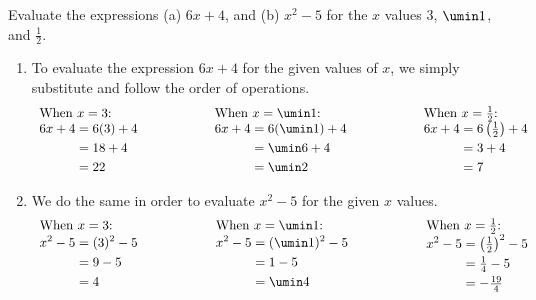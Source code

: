 \begin{boxex}
\label{ex:evaluating}
Evaluate the expressions (a) $6x+ 4$, and (b) $x^2 - 5$ for the $x$ values 3, $\umin1$, and $\frac{1}{2}$.

\exsoln{}
\begin{enumerate}[label={(\alph*)}]
\item To evaluate the expression $6x + 4$ for the given values of $x$, we simply substitute and follow the order of operations.
\[
\begin{array}{lllll}
\text{When $x=3$:}
&
&
\text{When $x=\umin1$:}
&
&
\text{When $x=\frac{1}{2}$:}
\\ %
\begin{aligned}
6x + 4 & = 6(3) + 4\\
& = 18 + 4\\
& = 22
\end{aligned}
&
\qquad\qquad
&
\begin{aligned}
6x + 4 & = 6(\umin1) + 4\\
& = \umin6 + 4\\
& = \umin2
\end{aligned}
&
\qquad\qquad
&
\begin{aligned}
6x + 4 & = 6\left(\tfrac{1}{2}\right) + 4\\
& = 3 + 4\\
& = 7
\end{aligned}
\end{array}
\]

\item We do the same in order to evaluate $x^2 - 5$ for the given $x$ values.
\[
\begin{array}{lllll}
\text{When $x=3$:}
&
&
\text{When $x=\umin1$:}
&
&
\text{When $x=\frac{1}{2}$:}
\\ %
\begin{aligned}
x^2 - 5 & = (3)^2 - 5\\
& = 9 - 5\\
& = 4
\end{aligned}
&
\qquad\qquad
&
\begin{aligned}
x^2 - 5 & = (\umin1)^2 - 5\\
& = 1 - 5\\
& = \umin4
\end{aligned}
&
\qquad\qquad
&
\begin{aligned}
x^2 - 5 & = \left(\tfrac{1}{2}\right)^2 - 5\\
& = \tfrac{1}{4} - 5\\
& = -\tfrac{19}{4}
\end{aligned}
\end{array}
\]
\end{enumerate}
\end{boxex}

